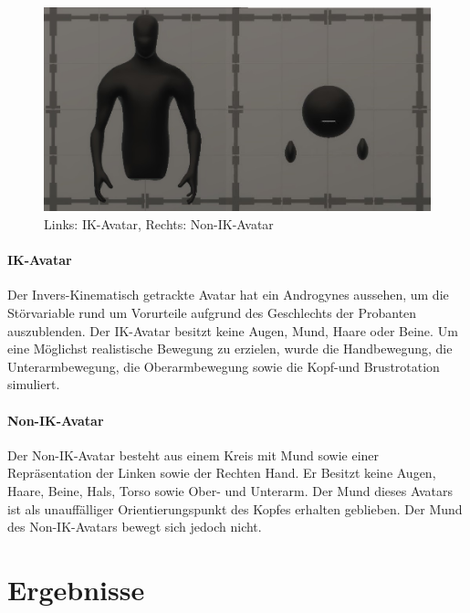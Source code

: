 \documentclass[a4paper,11pt]{article}%
\renewcommand{\\}{\vspace*{0.5\baselineskip} \newline}
\begin{document}
	\begin{figure}[H]
		\begin{footnotesize}
			\includegraphics[width=\textwidth]{Abbildungen/Avatars.JPG}\\
			\caption[Abbildung 1]{Links: IK-Avatar, Rechts: Non-IK-Avatar}
			\label{Framework}
		\end{footnotesize}
	\end{figure}

		\paragraph{IK-Avatar}
Der Invers-Kinematisch getrackte Avatar hat ein Androgynes aussehen, um die Störvariable rund um Vorurteile aufgrund des Geschlechts der Probanten auszublenden. Der IK-Avatar besitzt keine Augen, Mund, Haare oder Beine. 
Um eine Möglichst realistische Bewegung zu erzielen, wurde die Handbewegung, die Unterarmbewegung, die Oberarmbewegung sowie die Kopf-und Brustrotation simuliert.

		\paragraph{Non-IK-Avatar}
Der Non-IK-Avatar besteht aus einem Kreis mit Mund sowie einer Repräsentation der Linken sowie der Rechten Hand. Er Besitzt keine Augen, Haare, Beine, Hals, Torso sowie Ober- und Unterarm. Der Mund dieses Avatars ist als unauffälliger Orientierungspunkt des Kopfes erhalten geblieben. Der Mund des Non-IK-Avatars bewegt sich jedoch nicht. 
	\newpage
	\section{Ergebnisse}
\end{document}
